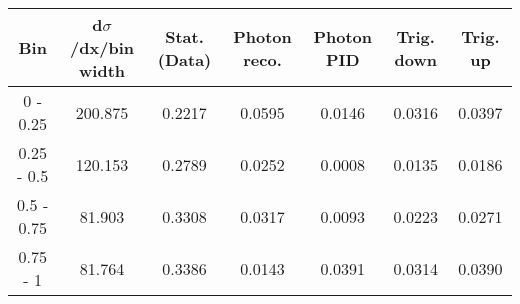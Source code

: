 \documentclass{article}
\begin{document}
\begin{table}[H]
\begin{adjustbox}{width=1\textwidth}
\begin{tabular}{|c|c|c|c|c|c|c|}
\hline
Bin & d$\sigma$/dx/bin width & Stat. (Data) & Photon reco. & Photon PID & Trig. down & Trig. up \\
\hline
0 - 0.25 & 200.875 & 0.2217 & 0.0595 & 0.0146 & 0.0316 & 0.0397 \\
\hline
0.25 - 0.5 & 120.153 & 0.2789 & 0.0252 & 0.0008 & 0.0135 & 0.0186 \\
\hline
0.5 - 0.75 & 81.903 & 0.3308 & 0.0317 & 0.0093 & 0.0223 & 0.0271 \\
\hline
0.75 - 1 & 81.764 & 0.3386 & 0.0143 & 0.0391 & 0.0314 & 0.0390 \\
\hline
\end{tabular}
\end{adjustbox}
\end{table}
\end{document}

